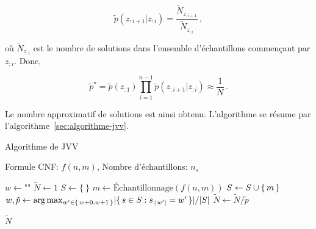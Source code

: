 \begin{equation}
    \tilde p(z_{:i+1}|z_{:i}) = \frac{ \tilde N_{z_{:i+1}} }{ \tilde N_{z_{:i}} } \,,
\end{equation}

où $\tilde{N}_{z_{:i}}$ est le nombre de solutions dans l'ensemble d'échantillons commençant par $z_{:i}$. Donc,

\begin{equation}
    \tilde p^\star = \tilde p(z_{:1}) \prod_{i=1}^{n-1} \tilde p(z_{:i+1}|z_{:i}) \approx \frac1N \,.
\end{equation}



Le nombre approximatif de solutions est ainsi obtenu. L'algorithme se résume par l'algorithme~\ref{sec:algorithme-jvv}.

\begin{algorithm}[h!]
    \caption{Algorithme de JVV}\label{alg:algorithme-jvv}
    \begin{algorithmic}[1]
    \REQUIRE Formule CNF: $f(n, m)$, Nombre d'échantillons: $n_{s}$

    \STATE $w \leftarrow \texttt{""}$ 
    \STATE $\tilde{N} \leftarrow 1$
    \STATE $S \leftarrow \{ \ \}$
    \STATE $m \leftarrow \text{Échantillonnage}(f(n,m))$
    \STATE $S \leftarrow S \cup \set{m}$
    \ENDWHILE
    \STATE $w, \tilde{p} \leftarrow \arg \max_{w' \in \set{ w + 0, w + 1 }} \lvert \set{ s \in S : s_{:\lvert w' \rvert } = w' } \rvert / \lvert S \rvert$
    \STATE $\tilde{N} \leftarrow \tilde{N} / \tilde{p}$
    \ENDFOR
    
    \RETURN $\tilde{N}$
\end{algorithmic}
\end{algorithm}
